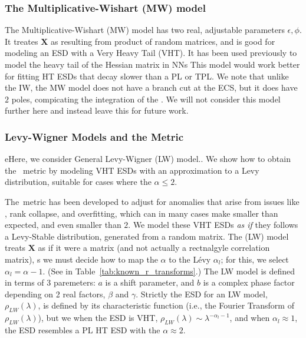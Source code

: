 \subsubsection{The Multiplicative-Wishart (MW) model}
The Multiplicative-Wishart (MW) model  has two real, adjustable parameters $\epsilon,\phi$.
It treates $\mathbf{X}$ as resulting from product of random matrices, and is good for modeling an ESD with a Very Heavy Tail (VHT).
It has been used previously to model the heavy tail of the Hessian matrix in NNs\cite{Pennington2017}
This model would work better for fitting HT ESDs that decay slower than a PL or TPL.
We note that unlike the IW, the MW model does not have a branch cut at the ECS, but it does
have $2$ poles, compicating the integration of the  \RTransform.
We will not consider this model further here and instead leave this for future work.


\subsubsection{Levy-Wigner Models and the \ALPHAHAT Metric}

eHere, we consider General Levy-Wigner (LW) model..
We show how to obtain the \WW~\ALPHAHAT metric by modeling VHT ESDs with an approximation to a Levy distribution, suitable
for cases where the \HTSR $\alpha\le 2$.  

The~\ALPHAHAT metric has been developed to adjust for \SCALE anomalies that arise from issues like \CorrelationTraps,
rank collapse, and overfitting, which can in many cases make \ALPHA smaller than expected, and even smaller than $2$.
We model these VHT ESDs  \emph{as if} they follows a Levy-Stable distribution, generated from a \LevyWigner random matrix.
The  \LevyWigner (LW) model treats  $\mathbf{X}$ as if it were a \Wigner matrix (and not actually a rectnalgyle correlation  matrix),
s we must decide how to map the \HTSR $\alpha$ to the L\'evy $\alpha_{l}$; for this, we select $\alpha_{l}=\alpha-1$.
(See in Table~\ref{tab:known_r_transforms}.)
The LW model is defined in terms of 3 paremeters:
$a$ is a shift parameter, and $b$ is a complex phase factor depending on 2 real factors, $\beta$ and $\gamma$.
Strictly the ESD for an LW model, $\rho_{LW}(\lambda)$, is defined by its characteristic function (i.e., the Fourier Transform of $\rho_{LW}(\lambda)$), but we  when the ESD is VHT, $\rho_{LW}(\lambda)\sim\lambda^{-\alpha_{l}-1}$, and  when $\alpha_{l}\approx 1$, the ESD resembles a PL HT ESD with the \HTSR $\alpha\approx 2$.

